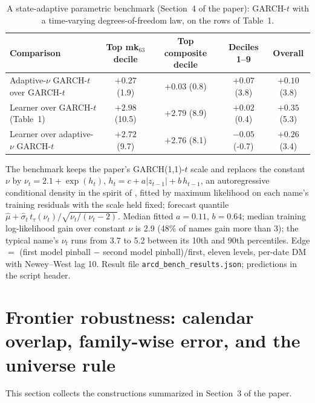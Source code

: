 \documentclass[11pt]{article}
\begin{document}
\begin{table}[htbp]
\centering
\begin{threeparttable}
\caption{A state-adaptive parametric benchmark (Section~4 of the paper): GARCH-$t$ with a time-varying degrees-of-freedom law, on the rows of Table~1.}
\label{tab:arcd}
\scriptsize\setlength{\tabcolsep}{4pt}
\begin{tabular}{lcccc}
\toprule
Comparison & Top mk$_{63}$ decile & Top composite decile & Deciles 1--9 & Overall \\
\midrule
Adaptive-$\nu$ GARCH-$t$ over GARCH-$t$ & $+0.27$ (1.9) & $+0.03$ (0.8) & $+0.07$ (3.8) & $+0.10$ (3.8) \\
Learner over GARCH-$t$ (Table~1) & $+2.98$ (10.5) & $+2.79$ (8.9) & $+0.02$ (0.4) & $+0.35$ (5.3) \\
Learner over adaptive-$\nu$ GARCH-$t$ & $+2.72$ (9.7) & $+2.76$ (8.1) & $-0.05$ (-0.7) & $+0.26$ (3.4) \\
\bottomrule
\end{tabular}
\begin{tablenotes}\footnotesize
\item The benchmark keeps the paper's GARCH(1,1)-$t$ scale and replaces the constant $\nu$ by $\nu_t = 2.1 + \exp(h_t)$, $h_t = c + a|z_{t-1}| + b\,h_{t-1}$, an autoregressive conditional density in the spirit of \citet{hansen1994ARCD}, fitted by maximum likelihood on each name's training residuals with the scale held fixed; forecast quantile $\widehat\mu + \widehat\sigma_t\, t_\tau(\nu_t)/\sqrt{\nu_t/(\nu_t-2)}$. Median fitted $a = 0.11$, $b = 0.64$; median training log-likelihood gain over constant $\nu$ is 2.9 (48\% of names gain more than 3); the typical name's $\nu_t$ runs from 3.7 to 5.2 between its 10th and 90th percentiles. Edge $=$ (first model pinball $-$ second model pinball)/first, eleven levels, per-date DM with Newey--West lag 10. Result file \texttt{arcd\_bench\_results.json}; predictions in the script header.
\end{tablenotes}
\end{threeparttable}
\end{table}

\section{Frontier robustness: calendar overlap, family-wise error, and the universe rule}
This section collects the constructions summarized in Section~3 of the paper.
\end{document}

